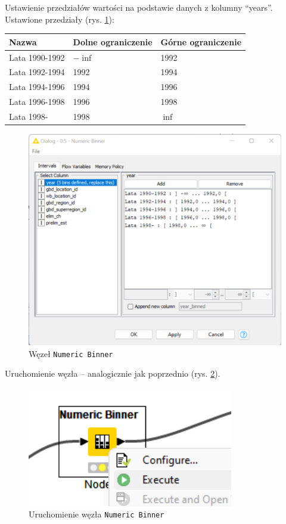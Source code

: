 \documentclass[11pt]{report}
\begin{document}
Ustawienie przedziałów wartości na podstawie danych z kolumny \enquote{years}. Ustawione przedziały (rys. \ref{fig:numeric_binner_2}):

\begin{tabular}{lll}
    Nazwa          & Dolne ograniczenie & Górne ograniczenie \\ \hline
    Lata 1990-1992 & $-\inf$            & 1992               \\
    Lata 1992-1994 & 1992               & 1994               \\
    Lata 1994-1996 & 1994               & 1996               \\
    Lata 1996-1998 & 1996               & 1998               \\
    Lata 1998-     & 1998               & $\inf$             \\
\end{tabular}

\begin{figure}[h]
    \centering
    \includegraphics[width=.8\textwidth]{numeric_binner_2.png}
    \caption{Węzeł \texttt{Numeric Binner}\label{fig:numeric_binner_2}}
\end{figure}

Uruchomienie węzła -- analogicznie jak poprzednio (rys. \ref{fig:numeric_binner_3}).

\begin{figure}[h]
    \centering
    \includegraphics[width=.4\textwidth]{numeric_binner_3.png}
    \caption{Uruchomienie węzła \texttt{Numeric Binner}\label{fig:numeric_binner_3}}
\end{figure}
\end{document}
